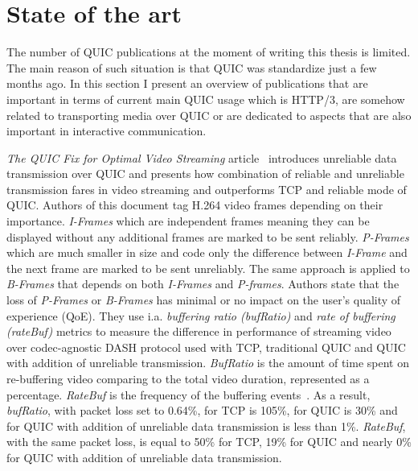 \chapter{State of the art}
\label{ch:state-of-the-art}

The number of QUIC publications at the moment of writing this thesis is limited.
The main reason of such situation is that QUIC was standardize just a few months ago.
In this section I present an overview of publications that are important in terms of current main QUIC usage which is
HTTP/3, are somehow related to transporting media over QUIC or are dedicated to aspects that are also important
in interactive communication.

\textit{The QUIC Fix for Optimal Video Streaming} article~\cite{the-quic-fix-for-optimal-video-streaming} introduces unreliable data transmission over QUIC and presents how combination of reliable and unreliable transmission fares in video streaming and outperforms TCP and reliable mode of QUIC\@.
Authors of this document tag H.264 video frames depending on their importance.
\textit{I-Frames} which are independent frames meaning they can be displayed without any additional frames are marked to be sent reliably.
\textit{P-Frames} which are much smaller in size and code only the difference between \textit{I-Frame} and the next frame are marked to be sent unreliably.
The same approach is applied to \textit{B-Frames} that depends on both \textit{I-Frames} and \textit{P-frames}.
Authors state that the loss of \textit{P-Frames} or \textit{B-Frames} has minimal or no impact on the user's quality of experience (QoE).
They use i.a. \textit{buffering ratio (bufRatio)} and \textit{rate of buffering (rateBuf)} metrics to measure the difference in performance of streaming video over codec-agnostic DASH protocol used with TCP, traditional QUIC and QUIC with addition of unreliable transmission.
\textit{BufRatio} is the amount of time spent on re-buffering video comparing to the total video duration, represented as a percentage.
\textit{RateBuf} is the frequency of the buffering events~\cite{impact-of-video-quality-on-user-engagement}.
As a result, \textit{bufRatio}, with packet loss set to 0.64\%, for TCP is 105\%, for QUIC is 30\% and for QUIC with addition of unreliable data transmission is less than 1\%.
\textit{RateBuf}, with the same packet loss, is equal to 50\% for TCP, 19\% for QUIC and nearly 0\% for QUIC with addition of unreliable data transmission.

